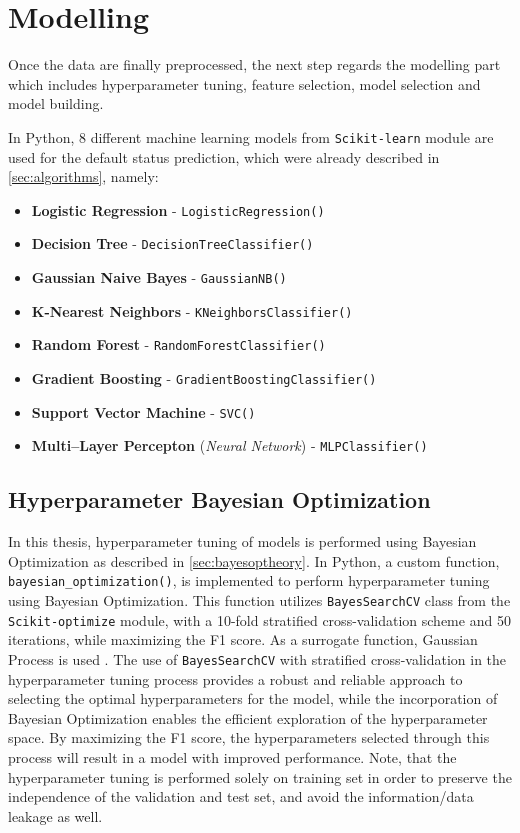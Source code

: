 \newpage
\section{Modelling}
Once the data are finally preprocessed, the next step regards the modelling part which includes hyperparameter tuning, feature selection, model selection and model building.

In Python, 8 different machine learning models from \lstinline{Scikit-learn} module are used for the default status prediction, which were already described in \autoref{sec:algorithms}, namely:
\begin{itemize}\setlength\itemsep{0em}
\item \textbf{Logistic Regression} - \lstinline{LogisticRegression()}
\item \textbf{Decision Tree} - \lstinline{DecisionTreeClassifier()}
\item \textbf{Gaussian Naive Bayes} - \lstinline{GaussianNB()}
\item \textbf{K-Nearest Neighbors} - \lstinline{KNeighborsClassifier()}
\item \textbf{Random Forest} - \lstinline{RandomForestClassifier()}
\item \textbf{Gradient Boosting} - \lstinline{GradientBoostingClassifier()}
\item \textbf{Support Vector Machine} - \lstinline{SVC()}
\item \textbf{Multi--Layer Percepton} (\textit{Neural Network}) - \lstinline{MLPClassifier()}
\end{itemize}

\subsection{Hyperparameter Bayesian Optimization}
In this thesis, hyperparameter tuning of models is performed using Bayesian Optimization as described in \autoref{sec:bayesoptheory}.
In Python, a custom function, \lstinline{bayesian_optimization()}, is implemented to perform hyperparameter tuning using Bayesian Optimization.
This function utilizes \lstinline{BayesSearchCV} class from the \lstinline{Scikit-optimize} module, with a 10-fold stratified cross-validation scheme and 50 iterations, while maximizing the F1 score. As a surrogate function, Gaussian Process is used \citep{scikit-opt}.
The use of \lstinline{BayesSearchCV} with stratified cross-validation in the hyperparameter tuning process provides a robust and reliable approach to selecting the optimal hyperparameters for the model, while the incorporation of Bayesian Optimization enables the efficient exploration of the hyperparameter space.
By maximizing the F1 score, the hyperparameters selected through this process will result in a model with improved performance. Note, that the hyperparameter tuning is performed solely on training set in order to preserve the independence of the validation and test set, and avoid the information/data leakage as well.


